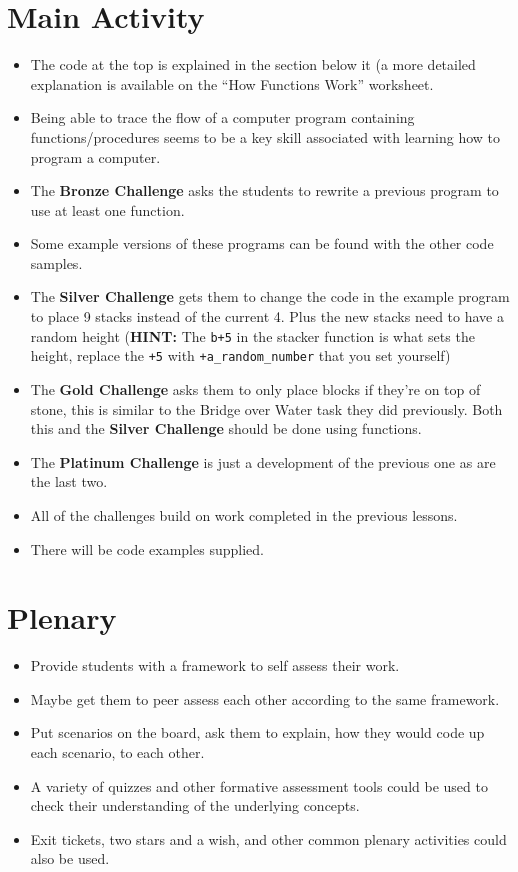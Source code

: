 \documentclass{geocraft-lesson-plan}
\begin{document}
\section*{Main Activity}
\begin{itemize}
\item The code at the top is explained in the section below it (a more detailed explanation is available on the ``How 
  Functions Work'' worksheet.
\item Being able to trace the flow of a computer program containing functions/procedures seems to be a key skill
  associated with learning how to program a computer.
\item The \textbf{Bronze Challenge} asks the students to rewrite a previous program to use at least one function.
\item Some example versions of these programs can be found with the other code samples.
\item The \textbf{Silver Challenge} gets them to change the code in the example program to place 9 stacks instead of the
  current 4. Plus the new stacks need to have a random height (\textbf{HINT:} The \verb!b+5! in the stacker function is
  what sets the height, replace the \verb!+5! with \verb!+a_random_number! that you set yourself)
\item The \textbf{Gold Challenge} asks them to only place blocks if they're on top of stone, this is similar to the
  Bridge over Water task they did previously. Both this and the \textbf{Silver Challenge} should be done using
  functions. 
\item The \textbf{Platinum Challenge} is just a development of the previous one as are the last two.
\item All of the challenges build on work completed in the previous lessons.
\item There will be code examples supplied.
\end{itemize}

\section*{Plenary}
\begin{itemize}
\item Provide students with a framework to self assess their work.
\item Maybe get them to peer assess each other according to the same framework.
\item Put scenarios on the board, ask them to explain, how they would code up each scenario, to each other. 
\item A variety of quizzes and other formative assessment tools could be used to check their understanding of the
  underlying concepts.
\item Exit tickets, two stars and a wish, and other common plenary activities could also be used.
\end{itemize}
\end{document}
